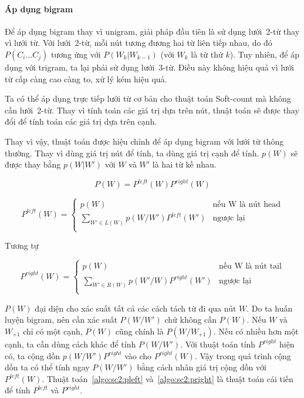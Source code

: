 \documentclass[a4paper,oneside,14pt]{extbook} %
\begin{document}
\paragraph{Áp dụng bi\-gram}

Để áp dụng bi\-gram thay vì
uni\-gram, giải pháp đầu tiên là sử dụng lưới~2-từ thay vì lưới từ. Với
lưới~2-từ, mỗi nút tương đương hai từ liên tiếp nhau, do đó
$P(C_i\ldots C_j)$ tương ứng với $P(W_k|W_{k-1})$ (với $W_k$ là từ thứ
$k$). Tuy nhiên, để áp dụng với tri\-gram, ta lại phải sử dụng
lưới~3-từ. Điều này không hiệu quả vì lưới từ cấp càng cao càng
to, xử lý kém hiệu quả.

Ta có thể áp dụng trực tiếp lưới từ cơ bản cho thuật toán Soft-count
mà không cần lưới~2-từ. Thay vì tính toán các giá trị dựa trên nút,
thuật toán sẽ được thay đổi để tính toán các giá trị dựa trên cạnh.

Thay vì vậy, thuật toán được hiệu chỉnh để áp dụng bi\-gram với lưới từ
thông thường. Thay vì dùng giá trị nút để tính, ta dùng giá trị cạnh
để tính. $p(W)$ sẽ được thay bằng $p(W|W')$ với $W$ và $W'$ là hai từ
kề nhau.

$$P(W)=P^{left}(W)P^{right}(W)$$

$$
P^{left}(W) = \left\{
    \begin{array}{ll}
      p(W)&\text{nếu W là nút head}\\
      \displaystyle\sum_{W' \in L(W)}p(W/W')P^{left}(W')&\text{ngược lại}\\
    \end{array}
  \right.
$$

Tương tự

$$
P^{right}(W) = \left\{
    \begin{array}{ll}
      p(W)&\text{nếu W là nút tail}\\
      \displaystyle\sum_{W' \in R(W)}p(W'/W)P^{right}(W')&\text{ngược lại}\\
    \end{array}
  \right.
$$

$P(W)$ đại diện cho xác suất tất cả các cách tách từ đi qua nút
$W$. Do ta huấn luyện bi\-gram, nên cần xác suất $P(W/W')$ chứ không cần
$P(W)$. Nếu $W$ và $W_{+1}$ chỉ có một cạnh, $P(W)$ cũng chính là
$P(W/W_{+1})$. Nếu có nhiều hơn một cạnh, ta cần dùng cách khác để
tính $P(W/W')$. Với thuật toán tính $P^{right}$ hiện có, ta cộng dồn
$p(W/W')P^{right}$ vào cho $P^{right}(W)$. Vậy trong quá trình cộng
dồn ta có thể tính ngay $P(W/W')$ bằng cách nhân giá trị cộng dồn với
$P^{left}(W)$. Thuật toán~\ref{algo:sc2:pleft}
và~\ref{algo:sc2:pright} là thuật toán cải tiến để tính  $P^{left}$ và
$P^{right}$.
\end{document}
